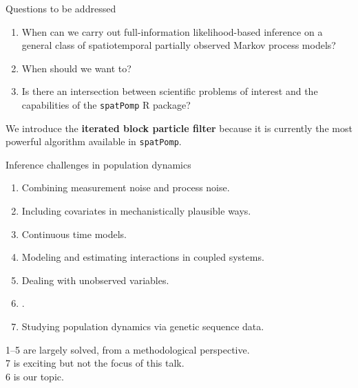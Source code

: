 \documentclass{beamer}
\begin{document}
\begin{frame}{Questions to be addressed}

  \begin{enumerate}
  \item When can we carry out full-information likelihood-based inference on a general class of spatiotemporal partially observed Markov process models?

    \vspace{2mm}
    
  \item When should we want to?

    \vspace{2mm}
    
  \item Is there an intersection between scientific problems of interest and the capabilities of the \texttt{spatPomp} R package?
  \end{enumerate}

  \vspace{10mm}

  We introduce the {\bf iterated block particle filter} because it is currently the most powerful algorithm available in \texttt{spatPomp}.

\end{frame}

\newcommand\challengeSep{\vspace{3mm}}

\begin{frame}{Inference challenges in population dynamics}

  \begin{enumerate}
\item Combining measurement noise and process noise.
\item Including covariates in mechanistically plausible ways.
\item  Continuous time models.
\item  Modeling and estimating interactions in coupled systems.
\item  Dealing with unobserved variables.
\item  {}.
\item  Studying population dynamics via genetic sequence data.
  \end{enumerate}

  \vspace{4mm}
  
  1--5 are largely solved, from a methodological perspective.\\
  7 is exciting but not the focus of this talk.\\
  6 is our topic.

  \vspace{4mm}

  
\end{frame}
\end{document}
